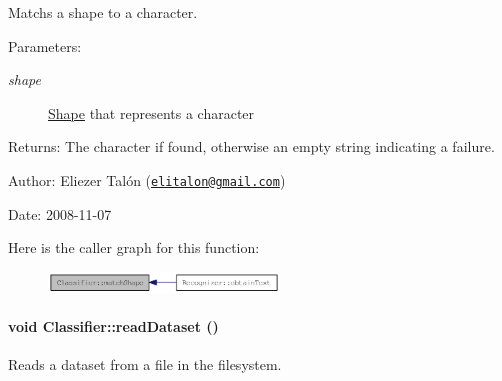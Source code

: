 Matchs a shape to a character. 

\begin{Desc}
\item[Parameters:]
\begin{description}
\item[{\em shape}]\hyperlink{class_shape}{Shape} that represents a character\end{description}
\end{Desc}
\begin{Desc}
\item[Returns:]The character if found, otherwise an empty string indicating a failure.\end{Desc}
\begin{Desc}
\item[Author:]Eliezer Talón (\href{mailto:elitalon@gmail.com}{\tt elitalon@gmail.com}) \end{Desc}
\begin{Desc}
\item[Date:]2008-11-07 \end{Desc}


Here is the caller graph for this function:\nopagebreak
\begin{figure}[H]
\begin{center}
\leavevmode
\includegraphics[width=174pt]{class_classifier_6fd6a8332d3188ac605ff452ab6dc9c2_icgraph}
\end{center}
\end{figure}
\hypertarget{class_classifier_8bbab7df78bc986a303fd72a6a472519}{
\paragraph[{readDataset}]{\setlength{\rightskip}{0pt plus 5cm}void Classifier::readDataset ()}\hfill}
\label{class_classifier_8bbab7df78bc986a303fd72a6a472519}


Reads a dataset from a file in the filesystem. 

